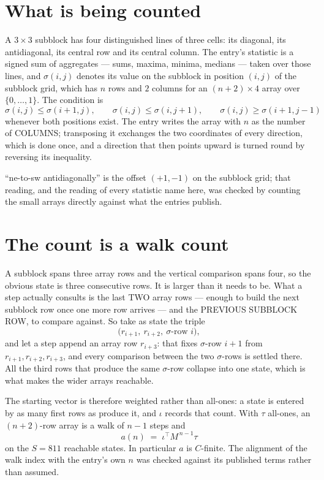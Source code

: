 \documentclass[11pt,a4paper]{article}
\theoremstyle{plain}
\theoremstyle{definition}
\begin{document}
\section{What is being counted}

A $3\times3$ subblock has four distinguished lines of three cells: its diagonal, its
antidiagonal, its central row and its central column. The entry's statistic is a signed sum of
aggregates --- sums, maxima, minima, medians --- taken over those lines, and $\sigma(i,j)$
denotes its value on the subblock in position $(i,j)$ of the subblock grid, which has $n$ rows
and $2$ columns for an $(n+2)\times4$ array over $\{0,\dots,1\}$. The condition is
\[
\sigma(i,j)\le\sigma(i+1,j),\qquad \sigma(i,j)\le\sigma(i,j+1),\qquad \sigma(i,j)\ge\sigma(i+1,j-1)
\]
whenever both positions exist. The entry writes the array with $n$ as the number of COLUMNS; transposing it exchanges the two coordinates of every direction, which is done once, and a direction that then points upward is turned round by reversing its inequality.

``ne-to-sw antidiagonally'' is the offset $(+1,-1)$ on the subblock grid; that reading, and
the reading of every statistic name here, was checked by counting the small arrays directly
against what the entries publish.

\section{The count is a walk count}

A subblock spans three array rows and the vertical comparison spans four, so the obvious state
is three consecutive rows. It is larger than it needs to be. What a step actually consults is
the last TWO array rows --- enough to build the next subblock row once one more row arrives ---
and the PREVIOUS SUBBLOCK ROW, to compare against. So take as state the triple
\[
\bigl(r_{i+1},\ r_{i+2},\ \sigma\text{-row }i\bigr),
\]
and let a step append an array row $r_{i+3}$: that fixes $\sigma$-row $i+1$ from
$r_{i+1},r_{i+2},r_{i+3}$, and every comparison between the two $\sigma$-rows is settled
there. All the third rows that produce the same $\sigma$-row collapse into one state, which is
what makes the wider arrays reachable.

The starting vector is therefore weighted rather than all-ones: a state is entered by as many
first rows as produce it, and $\iota$ records that count. With $\tau$ all-ones, an
$(n+2)$-row array is a walk of $n-1$ steps and
\[
a(n)\;=\;\iota^{\!\top}M^{\,n-1}\tau
\]
on the $S=811$ reachable states. In particular $a$ is $C$-finite. The alignment of the walk
index with the entry's own $n$ was checked against its published terms rather than assumed.
\end{document}
